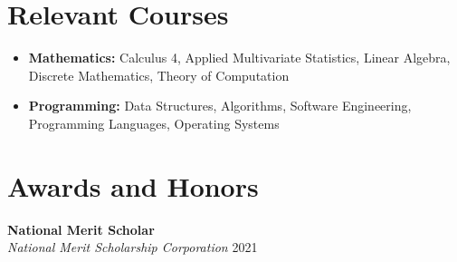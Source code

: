 \documentclass[a4paper,10pt]{extarticle}
\begin{document}
\section*{Relevant Courses}
\begin{itemize}
    \item \textbf{Mathematics:} Calculus 4, Applied Multivariate Statistics, Linear Algebra, Discrete Mathematics, Theory of Computation
    \item \textbf{Programming:} Data Structures, Algorithms, Software Engineering, Programming Languages, Operating Systems
\end{itemize}

\section*{Awards and Honors}
  \textbf{National Merit Scholar} \\
  \textit{National Merit Scholarship Corporation} \hfill 2021 %
\end{document}
